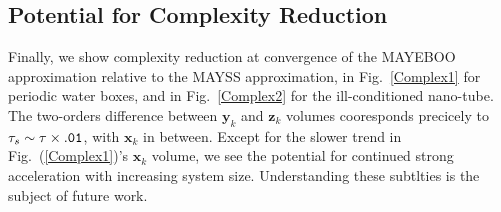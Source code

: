 \documentclass[letterpaper,twocolumn,amsmath,amsfont,amssymb,english,aps,jcp,preprintnumbers,groupaddress,nofootinbib,tightenlines,floatfix]{revtex4}
\newcommand{\mat}[1]{\boldsymbol{#1}}
\theoremstyle{plain}
\theoremstyle{remark}
\theoremstyle{plain}
\begin{document}
\subsection{Potential for Complexity Reduction}
  
Finally, we show complexity reduction at convergence of the MAYEBOO approximation relative to the MAYSS approximation, 
in Fig.~\ref{Complex1} for periodic water boxes, and in Fig.~\ref{Complex2} for the ill-conditioned nano-tube. 
The two-orders difference between $\mat{y}_k$ and $\mat{z}_k$ volumes cooresponds precicely to $\tau_s \sim \tau \times {\tt .01}$, 
with $\mat{x}_k$ in between. Except for the slower trend in Fig.~(\ref{Complex1})'s $\mat{x}_k$ volume, we see the 
potential for continued strong acceleration with increasing system size.  Understanding these subtlties is the subject of future work. 
\end{document}
